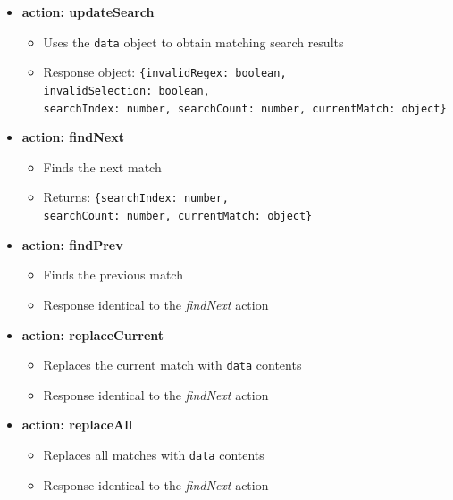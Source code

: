 \documentclass[bsc,frontabs,twoside,singlespacing,parskip,deptreport]{infthesis}
\providecommand{\tightlist}{%
  \setlength{\itemsep}{0pt}\setlength{\parskip}{0pt}}
\begin{document}
\begin{itemize}
\tightlist

\item\textbf{action: updateSearch}

\begin{itemize}
\tightlist
\item
  Uses the \texttt{data} object to obtain matching search results
\item
  Response object:
  \texttt{\{invalidRegex:\ boolean, invalidSelection:\ boolean,\\ searchIndex:\ number, searchCount:\ number, currentMatch:\ object\}}
\end{itemize}

\item\textbf{action: findNext}

\begin{itemize}
\tightlist
\item
  Finds the next match
\item
  Returns:
  \texttt{\{searchIndex:\ number, searchCount:\ number,\ currentMatch:\ object\}}
\end{itemize}

\item\textbf{action: findPrev}

\begin{itemize}
\tightlist
\item
  Finds the previous match
\item
  Response identical to the \textit{findNext} action
\end{itemize}

\item\textbf{action: replaceCurrent}

\begin{itemize}
\tightlist
\item
  Replaces the current match with \texttt{data} contents
\item
  Response identical to the \textit{findNext} action
\end{itemize}

\item\textbf{action: replaceAll}

\begin{itemize}
\tightlist
\item
  Replaces all matches with \texttt{data} contents
\item
  Response identical to the \textit{findNext} action
\end{itemize}


\end{itemize}
\end{document}
